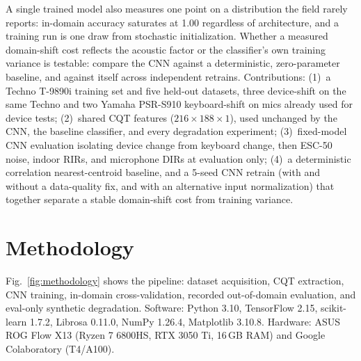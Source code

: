 \documentclass[pdflatex,sn-mathphys-num,iicol]{sn-jnl}
\theoremstyle{thmstyleone}
\theoremstyle{thmstyletwo}
\theoremstyle{thmstylethree}
\begin{document}
A single trained model also measures one point on a distribution the field rarely reports: in-domain accuracy saturates at 1.00 regardless of architecture, and a training run is one draw from stochastic initialization. Whether a measured domain-shift cost reflects the acoustic factor or the classifier's own training variance is testable: compare the CNN against a deterministic, zero-parameter baseline, and against itself across independent retrains. Contributions: (1)~a Techno T-9890i training set and five held-out datasets, three device-shift on the same Techno and two Yamaha PSR-S910 keyboard-shift on mics already used for device tests; (2)~shared CQT features ($216\times188\times1$), used unchanged by the CNN, the baseline classifier, and every degradation experiment; (3)~fixed-model CNN evaluation isolating device change from keyboard change, then ESC-50 noise, indoor RIRs, and microphone DIRs at evaluation only; (4)~a deterministic correlation nearest-centroid baseline, and a 5-seed CNN retrain (with and without a data-quality fix, and with an alternative input normalization) that together separate a stable domain-shift cost from training variance.

\section{Methodology}\label{sec3}

Fig.~\ref{fig:methodology} shows the pipeline: dataset acquisition, CQT extraction, CNN training, in-domain cross-validation, recorded out-of-domain evaluation, and eval-only synthetic degradation. Software: Python 3.10, TensorFlow 2.15, scikit-learn 1.7.2, Librosa 0.11.0, NumPy 1.26.4, Matplotlib 3.10.8. Hardware: ASUS ROG Flow X13 (Ryzen 7 6800HS, RTX 3050 Ti, 16\,GB RAM) and Google Colaboratory (T4/A100).
\end{document}
